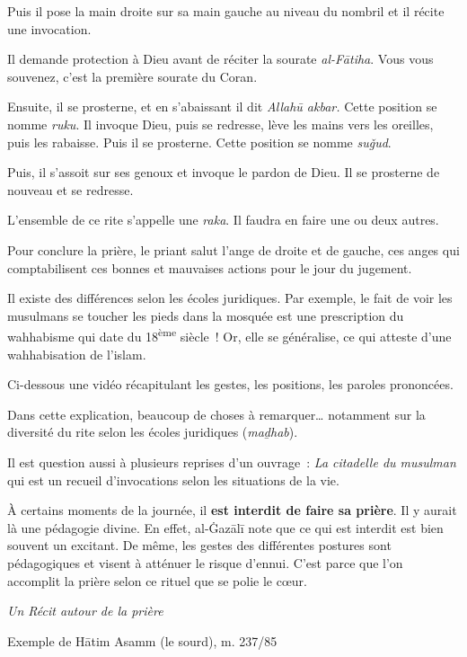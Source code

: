 Puis il pose la main droite sur sa main gauche au niveau du nombril et
il récite une invocation.

Il demande protection à Dieu avant de réciter la sourate
\emph{al-Fātiha}. Vous vous souvenez, c'est la première sourate du
Coran.

Ensuite, il se prosterne, et en s'abaissant il dit \emph{Allahū akbar.}
Cette position se nomme \emph{ruku}. Il invoque Dieu, puis se redresse,
lève les mains vers les oreilles, puis les rabaisse. Puis il se
prosterne. Cette position se nomme \emph{suǧud}.


Puis, il s'assoit sur ses genoux et invoque le pardon de Dieu. Il se
prosterne de nouveau et se redresse.

L'ensemble de ce rite s'appelle une \emph{raka}. Il faudra en faire une
ou deux autres.

Pour conclure la prière, le priant salut l'ange de droite et de gauche,
ces anges qui comptabilisent ces bonnes et mauvaises actions pour le
jour du jugement.

Il existe des différences selon les écoles juridiques. Par exemple, le
fait de voir les musulmans se toucher les pieds dans la mosquée est une
prescription du wahhabisme qui date du 18\textsuperscript{ème} siècle~!
Or, elle se généralise, ce qui atteste d'une wahhabisation de l'islam.

Ci-dessous une vidéo récapitulant les gestes, les positions, les paroles
prononcées.

Dans cette explication, beaucoup de choses à remarquer\ldots{} notamment
sur la diversité du rite selon les écoles juridiques (\emph{maḏhab}).

Il est question aussi à plusieurs reprises d'un ouvrage~: \emph{La
citadelle du musulman} qui est un recueil d'invocations selon les
situations de la vie.

À certains moments de la journée, il \textbf{est interdit de faire sa
prière}. Il y aurait là une pédagogie divine. En effet, al-Ġazālī \label{theol:AlGazali14} note
que ce qui est interdit est bien souvent un excitant. De même, les
gestes des différentes postures sont pédagogiques et visent à atténuer
le risque d'ennui. C'est parce que l'on accomplit la prière selon ce
rituel que se polie le cœur.

\emph{Un Récit autour de la prière}

Exemple de Hātim Asamm (le sourd), m. 237/85 

